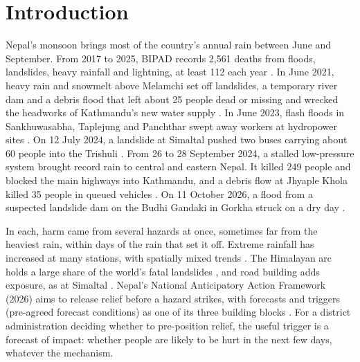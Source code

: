 \documentclass[conference]{IEEEtran}
\begin{document}
\section{Introduction}
Nepal's monsoon brings most of the country's annual rain between June and September. From 2017 to 2025, BIPAD records 2,561 deaths from floods, landslides, heavy rainfall and lightning, at least 112 each year \cite{BIPAD2026}. In June 2021, heavy rain and snowmelt above Melamchi set off landslides, a temporary river dam and a debris flood that left about 25 people dead or missing and wrecked the headworks of Kathmandu's new water supply \cite{Maharjan2021Melamchi,Duwadi2024}. In June 2023, flash floods in Sankhuwasabha, Taplejung and Panchthar swept away workers at hydropower sites \cite{KathmanduPost2023East}. On 12 July 2024, a landslide at Simaltal pushed two buses carrying about 60 people into the Trishuli \cite{KathmanduPost2024Simaltal}. From 26 to 28 September 2024, a stalled low-pressure system brought record rain to central and eastern Nepal. It killed 249 people and blocked the main highways into Kathmandu, and a debris flow at Jhyaple Khola killed 35 people in queued vehicles \cite{NDRRMA2024LossDamage,Lamichhane2025,Petley2025}. On 11 October 2026, a flood from a suspected landslide dam on the Budhi Gandaki in Gorkha struck on a dry day \cite{KathmanduPost2026,AlJazeera2026}.

In each, harm came from several hazards at once, sometimes far from the heaviest rain, within days of the rain that set it off. Extreme rainfall has increased at many stations, with spatially mixed trends \cite{Karki2017,Talchabhadel2018,IPCC2021Ch11}. The Himalayan arc holds a large share of the world's fatal landslides \cite{Petley2012,FroudePetley2018}, and road building adds exposure, as at Simaltal \cite{MunozTorrero2021,KathmanduPost2024Simaltal}. Nepal's National Anticipatory Action Framework (2026) aims to release relief before a hazard strikes, with forecasts and triggers (pre-agreed forecast conditions) as one of its three building blocks \cite{NDRRMA2026}. For a district administration deciding whether to pre-position relief, the useful trigger is a forecast of impact: whether people are likely to be hurt in the next few days, whatever the mechanism.
\end{document}
